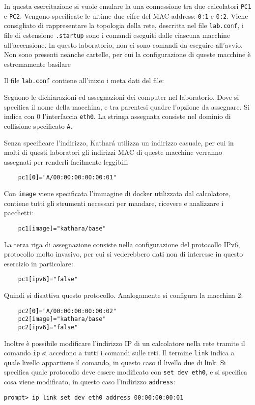 \documentclass{article}
\numberwithin{equation}{subsection}
\begin{document}
In questa esercitazione si vuole emulare la una connessione tra due calcolatori \verb|PC1| e \verb|PC2|. Vengono 
specificate le ultime due cifre del MAC address: \verb|0:1| e \verb|0:2|. 
Viene consigliato di rappresentare la topologia della rete, descritta nel file \verb|lab.conf|, i file di estensione \verb|.startup| sono i 
comandi eseguiti dalle ciascuna macchine all'accensione. In questo laboratorio, non ci sono comandi da eseguire all'avvio. Non sono presenti 
neanche cartelle, per cui la configurazione di queste macchine è estremamente basilare



Il file \verb|lab.conf| contiene all'inizio i meta dati del file:

Seguono le dichiarazioni ed assegnazioni dei computer nel laboratorio. Dove si 
specifica il nome della macchina, e tra parentesi quadre l'opzione da assegnare. 
Si indica con $0$ l'interfaccia \verb|eth0|. La stringa assegnata consiste nel 
dominio di collisione specificato \verb|A|. 

Senza specificare l'indirizzo, Kathar\'{a} utilizza un indirizzo casuale, per cui 
in molti di questi laboratori gli indirizzi MAC di queste macchine verranno 
assegnati per renderli facilmente leggibili:

\begin{verbatim}
    pc1[0]="A/00:00:00:00:00:01"
\end{verbatim}

Con \verb|image| viene specificata l'immagine di docker utilizzata dal calcolatore, 
contiene tutti gli strumenti necessari per mandare, ricevere e analizzare i pacchetti: 
\begin{verbatim}
    pc1[image]="kathara/base"
\end{verbatim}
La terza riga di assegnazione consiste nella configurazione del protocollo 
IPv6, protocollo molto invasivo, per cui si vederebbero dati non di interesse 
in questo esercizio in particolare:
\begin{verbatim}
	pc1[ipv6]="false"
\end{verbatim} 
Quindi si disattiva questo protocollo. Analogamente 
si configura la macchina 2:
\begin{verbatim}
	pc2[0]="A/00:00:00:00:00:02"
	pc2[image]="kathara/base"
	pc2[ipv6]="false"
\end{verbatim}
Inoltre è possibile modificare l'indirizzo IP di un calcolatore nella rete 
tramite il comando \verb|ip| si accedono a tutti i comandi sulle reti. 
Il termine \verb|link| indica a quale livello appartiene il comando, in questo caso il livello due di link. 
Si specifica quale protocollo deve essere modificato con \verb|set dev eth0|, e si specifica cosa viene modificato, in questo caso l'indirizzo \verb|address|:
\begin{verbatim}
prompt> ip link set dev eth0 address 00:00:00:00:01
\end{verbatim}
\end{document}
